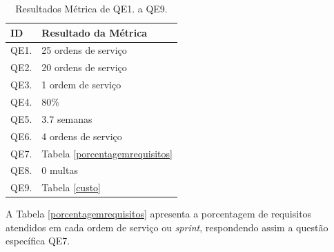 \begin{table}[h]
\footnotesize
\center
\begin{tabular}{|p{0.5cm}|p{5.0cm}|}
\hline
\textbf{ID}                                                                                                                                & \textbf{Resultado da Métrica}    \\ \hline
QE1.                                                                                                          & 25 ordens de serviço          \\ \hline
QE2.                                                                       & 20 ordens de serviço          \\ \hline
QE3.                                                                       & 1 ordem de serviço            \\ \hline
QE4.                                                                                                      & 80\%                          \\ \hline
QE5.                                                                                                  & 3.7 semanas                   \\ \hline
QE6.        & 4 ordens de serviço           \\ \hline
QE7.                                                                                    &  Tabela \ref{porcentagemrequisitos} \\ \hline
QE8.                                                                                                            & 0 multas                      \\ \hline
QE9.                                                                                             & Tabela \ref{custo}                 \\ \hline
\end{tabular}
\caption{Resultados Métrica de QE1. a QE9.}
		\label{resultadosmetricas}
\end{table}


A Tabela \ref{porcentagemrequisitos} apresenta a porcentagem de requisitos atendidos em cada ordem de serviço ou \textit{sprint}, respondendo assim a questão específica QE7.



